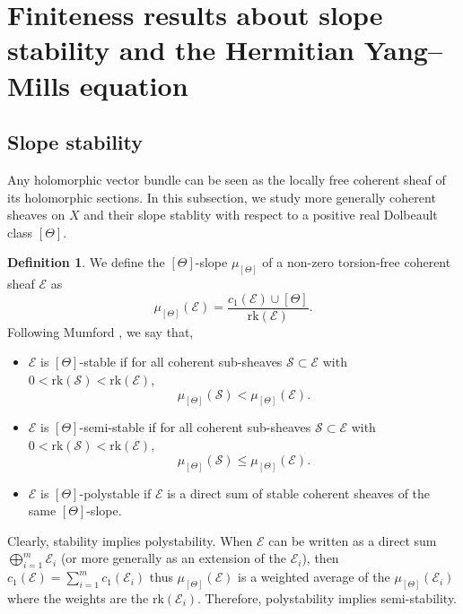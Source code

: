 \documentclass{article}
\theoremstyle{remark}
\theoremstyle{definition}
\newtheorem{definition}[theorem]{Definition}
\newcommand{\rk}{\mathrm{rk}}
\newcommand{\E}{\mathcal{E}}
\renewcommand{\leq}{\leqslant}
\begin{document}
\section{Finiteness results about slope stability and the Hermitian Yang--Mills equation}\label{SEC:Finitude des c_1}

\subsection{Slope stability}

Any holomorphic vector bundle can be seen as the locally free coherent sheaf of its holomorphic sections. In this subsection, we study more generally coherent sheaves on $X$ and their slope stablity with respect to a positive real Dolbeault class $[\Theta]$.
\begin{definition}
    We define the $[\Theta]$-slope $\mu_{[\Theta]}$ of a non-zero torsion-free coherent sheaf $\E$ as
    $$
    \mu_{[\Theta]}(\E) = \frac{c_1(\E) \cup [\Theta]}{\rk(\E)}.
    $$
    Following Mumford \cite{Mumford}, we say that,
    \begin{itemize}
        \item $\E$ is $[\Theta]$-stable if for all coherent sub-sheaves $\mathcal{S} \subset \E$ with $0 < \rk(\mathcal{S}) < \rk(\E)$,
        $$
        \mu_{[\Theta]}(\mathcal{S}) < \mu_{[\Theta]}(\E).
        $$
        \item $\E$ is $[\Theta]$-semi-stable if for all coherent sub-sheaves $\mathcal{S} \subset \E$ with $0 < \rk(\mathcal{S}) < \rk(\E)$,
        $$
        \mu_{[\Theta]}(\mathcal{S}) \leq \mu_{[\Theta]}(\E).
        $$
        \item $\E$ is $[\Theta]$-polystable if $\E$ is a direct sum of stable coherent sheaves of the same $[\Theta]$-slope.
    \end{itemize}
\end{definition}

Clearly, stability implies polystability. When $\E$ can be written as a direct sum $\bigoplus_{i = 1}^m \E_i$ (or more generally as an extension of the $\E_i$), then $c_1(\E) = \sum_{i = 1}^m c_1(\E_i)$ thus $\mu_{[\Theta]}(\E)$ is a weighted average of the $\mu_{[\Theta]}(\E_i)$ where the weights are the $\rk(\E_i)$. Therefore, polystability implies semi-stability.
\end{document}
